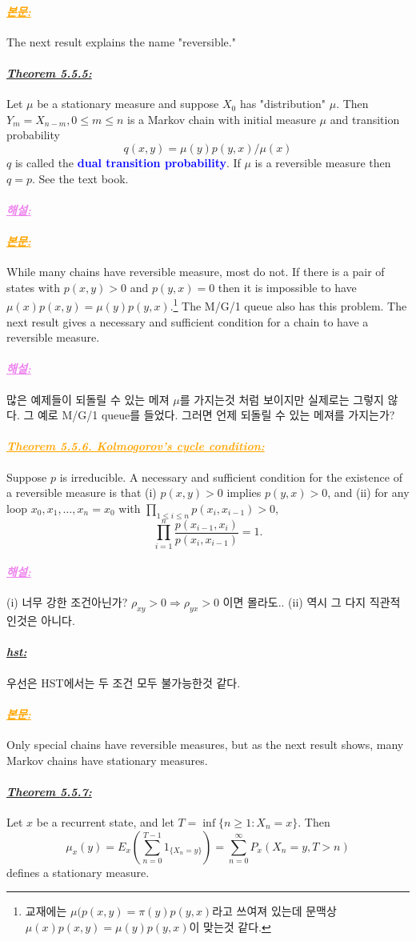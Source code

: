 \documentclass[12pt,oneside,english,a4paper]{article}
\newcommand{\para}[1]{\paragraph{\LARGE\it\underline{\textbf{#1:}}}\LARGE}
\newcommand{\paraviolet}[1]{\paragraph{\LARGE\textcolor{violet}{\it\underline{\textbf{#1:}}}}\LARGE}
\newcommand{\paraorange}[1]{\paragraph{\LARGE\textcolor{orange}{\it\underline{\textbf{#1:}}}}\LARGE}
\begin{document}
\paraorange{본문} The next result explains the name "reversible."
\para{Theorem 5.5.5} Let $\mu$ be a stationary measure and suppose $X_0$ has "distribution" $\mu$. Then $Y_m = X_{n-m}, 0\leq m \leq n$ is a Markov chain with initial measure $\mu$ and transition probability
\[
q(x, y) = \mu(y)p(y, x)/\mu(x)
\]
$q$ is called the \textcolor{blue}{\bf dual transition probability}. If $\mu$ is a reversible measure then $q = p$.
\proof See the text book. 

\paraviolet{해설} 

\paraorange{본문} While many chains have reversible measure, most do not. If there is a pair of states with $p(x, y) > 0$ and $p(y, x) = 0$ then it is impossible to have $\mu(x)p(x, y) = \mu(y)p(y, x)$.\footnote{교재에는 $\mu(p(x, y) = \pi(y)p(y, x)$라고 쓰여져 있는데 문맥상 $\mu(x)p(x, y) = \mu(y)p(y, x)$이 맞는것 같다.} The M/G/1 queue also has this problem. The next result gives a necessary and sufficient condition for a chain to have a reversible measure.

\paraviolet{해설} 많은 예제들이 되돌릴 수 있는 메져 $\mu$를 가지는것 처럼 보이지만 실제로는 그렇지 않다. 그 예로 M/G/1 queue를 들었다. 그러면 언제 되돌릴 수 있는 메져를 가지는가? 

\paraorange{Theorem 5.5.6. Kolmogorov’s cycle condition} Suppose $p$ is irreducible. A necessary and sufficient condition for the existence of a
reversible measure is that (i) $p(x,y)>0$ implies $p(y,x)>0$, and (ii) for any loop $x_0,x_1,\dots,x_n=x_0$ with $\prod_{1\leq i \leq n}p(x_i,x_{i-1})>0$,
\[
\prod_{i=1}^{n}\frac{p(x_{i-1},x_i)}{p(x_i,x_{i-1})}=1.
\]

\paraviolet{해설} (i) 너무 강한 조건아닌가? $\rho_{xy}>0 \Longrightarrow \rho_{yx}>0$ 이면 몰라도.. (ii) 역시 그 다지 직관적인것은 아니다. 

\para{hst} 우선은 HST에서는 두 조건 모두 불가능한것 같다. 

\paraorange{본문} Only special chains have reversible measures, but as the next result shows, many Markov chains have stationary measures. 

\para{Theorem 5.5.7} Let $x$ be a recurrent state, and let $T= \inf\{n \geq 1 :X_n = x\}$. Then
\[
\mu_x(y)=E_x\left(\sum_{n=0}^{T-1}1_{\{X_n=y\}}\right)=\sum_{n=0}^{\infty}P_x(X_n=y,T>n)
\]
defines a stationary measure. 
\end{document}
